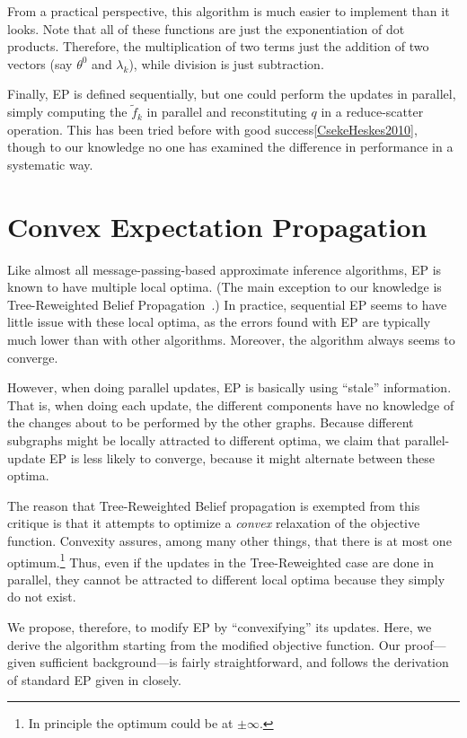 \documentclass[times, 10pt,twocolumn]{article}
\begin{document}
From a practical perspective, this algorithm is much easier to
implement than it looks. Note that all of these functions are just
the exponentiation of dot products. Therefore, the multiplication
of two terms just the addition of two vectors (say $\theta^0$ and
$\lambda_k$), while division is just subtraction. 

Finally, EP is defined sequentially, but one could perform the
updates in parallel, simply computing the $\tilde f_k$ in parallel
and reconstituting $q$ in a reduce-scatter operation. This has been
tried before with good success\ref{CsekeHeskes2010}, though to our
knowledge no one has examined the difference in performance in a
systematic way.

\section{Convex Expectation Propagation}

Like almost all message-passing-based approximate inference algorithms, EP is known to
have multiple local optima. (The main exception to our knowledge
is Tree-Reweighted Belief Propagation~\cite{wainwright03trw}.) In practice, sequential EP seems to have little
issue with these local optima, as the errors found with EP are
typically much lower than with other algorithms. Moreover, the
algorithm always seems to converge.

However, when doing parallel updates, EP is basically using
``stale'' information. That is, when doing each update, the
different components have no knowledge of the changes about to be
performed by the other graphs. Because different subgraphs might
be locally attracted to different optima, we claim that
parallel-update EP is less likely to converge, because it might
alternate between these optima. 

The reason that Tree-Reweighted Belief propagation is exempted from
this critique is that it attempts to optimize a \textit{convex}
relaxation of the objective function. Convexity assures, among many
other things, that there is at most one optimum.\footnote{In principle
the optimum could be at $\pm\infty$.} Thus, even if the updates in
the Tree-Reweighted case are done in parallel, they cannot be
attracted to different local optima because they simply do not
exist.

We propose, therefore, to modify EP by ``convexifying'' its updates.
Here, we derive the algorithm starting from the modified objective
function. Our proof---given sufficient background---is fairly
straightforward, and follows the derivation of standard EP given in
\cite{wainwright08graphical} closely.
\end{document}
